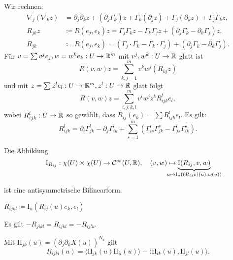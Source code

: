 \documentclass{cheat-sheet}
\newcommand{\I}{\mathrm{I}}
\newcommand{\II}{\mathrm{I\!I}}
\begin{document}

\begin{bem}
  Wir rechnen:
  \begin{align*}
    \nabla_j (\nabla_k z) &= \partial_j \partial_k z + (\partial_j \Gamma_k) z + \Gamma_k (\partial_j z) + \Gamma_j (\partial_k z) + \Gamma_j \Gamma_k z, \\
    R_{jk} z &\coloneqq R(e_j, e_k) z = \Gamma_j \Gamma_k z - \Gamma_k \Gamma_j z + (\partial_j \Gamma_k - \partial_k \Gamma_j) z, \\
    R_{jk} &\coloneqq R(e_j, e_k) = (\Gamma_j \cdot \Gamma_k - \Gamma_k \cdot \Gamma_j) + (\partial_j \Gamma_k - \partial_k \Gamma_j).
  \end{align*}
  Für $v = \sum v^j e_j, w = w^k e_k : U \to \R^m$ mit $v^j, w^k : U \to \mathbb{R}$ glatt ist
  \[ R(v, w) z = \sum_{k,j=1}^m v^k w^j (R_{kj} z) \]
  und mit $z = \sum z^l e_l : U \to \R^m, z^l : U \to \R$ glatt folgt
  \[ R(v, w) z = \sum_{i,j,k,l}^m v^i w^j z^k R_{ijk}^l e_l, \]
  wobei $R_{ijk}^l : U \to \mathbb{R}$ so gewählt, dass $R_{ij}(e_k) = \sum R_{ijk}^l e_l$. Es gilt:
  \[ R_{ijk}^l = \partial_i \Gamma_{jk}^l - \partial_j \Gamma_{ik}^l + \sum_{s=1}^m (\Gamma_{is}^l \Gamma_{jk}^s - \Gamma_{js}^l \Gamma_{ik}^s). \]
\end{bem}


\begin{satz}
  Die Abbildung
  \[
    \I_{R_{ij}} : \chi(U) \times \chi(U) \to \mathcal{C}^\infty(U, \R), \quad
    (v, w) \mapsto \underbrace{\I(R_{ij}, v, w)}_{\mathclap{u \mapsto \I_u((R_{ij} v)(u), w(u))}}
  \]

  \vspace{-12pt}

  ist eine antisymmetrische Bilinearform.
\end{satz}

\begin{nota}
  $R_{ijkl} \coloneqq \I_u(R_{ij}(u) e_k, e_l)$
\end{nota}

\begin{lem}
  Es gilt $- R_{jikl} = R_{ijkl} = - R_{ijlk}$.
\end{lem}

\begin{satz}[Gaußgleichung]
  Mit $\II_{jk}(u) = \left( \partial_j \partial_k X(u) \right)^{N_u}$ gilt
  \[ R_{ijkl}(u) = \langle \II_{jk} (u) \II_{il}(u) \rangle - \langle \II_{ik}(u), \II_{jl}(u) \rangle. \]
\end{satz}
\end{document}

